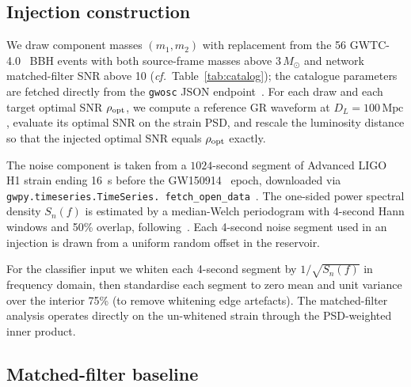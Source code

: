 \documentclass[11pt,a4paper]{article}
\newcommand{\msun}{M_{\odot}}
\newcommand{\Mpc}{\text{Mpc}}
\begin{document}
\subsection{Injection construction}\label{sec:injections}

We draw component masses $(m_{1},m_{2})$ with replacement from the
56 GWTC-4.0~\cite{LVK_GWTC4_2023} BBH events with both source-frame
masses above $3\,\msun$ and network matched-filter SNR above 10
(\textit{cf.}~Table~\ref{tab:catalog}); the catalogue parameters are
fetched directly from the \texttt{gwosc} JSON
endpoint~\cite{GWOSC2021,gwpy2021}. For each draw and each target
optimal SNR $\rho_{\rm opt}$, we compute a reference GR waveform at
$D_{L}=100\,\Mpc$, evaluate its optimal SNR on the strain PSD, and
rescale the luminosity distance so that the injected optimal SNR equals
$\rho_{\rm opt}$ exactly.

The noise component is taken from a $1024$-second segment of Advanced
LIGO~\cite{Aasi2015_aLIGO} H1 strain ending 16~s before the
GW150914~\cite{Abbott2016_GW150914} epoch, downloaded via
\texttt{gwpy.timeseries.\allowbreak TimeSeries.\allowbreak
fetch\_open\_data}~\cite{gwpy2021}.
The one-sided power spectral density $S_{n}(f)$ is estimated by a
median-Welch periodogram with 4-second Hann windows and 50\% overlap,
following~\cite{Allen2012}. Each 4-second noise segment used in an
injection is drawn from a uniform random offset in the reservoir.

For the classifier input we whiten each 4-second segment by
$1/\!\sqrt{S_{n}(f)}$ in frequency domain, then standardise each
segment to zero mean and unit variance over the interior 75\% (to remove
whitening edge artefacts). The matched-filter analysis operates directly
on the un-whitened strain through the PSD-weighted inner product.

\subsection{Matched-filter baseline}\label{sec:mf}
\end{document}
